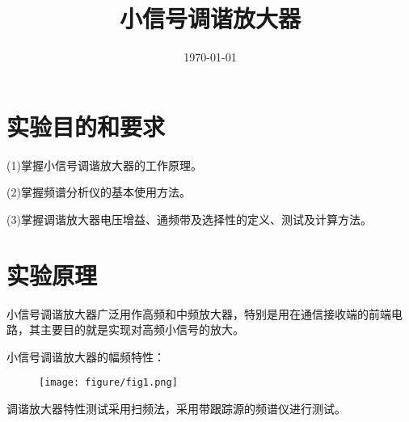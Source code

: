 \documentclass{../source/Experiment}
\title{小信号调谐放大器}
\date{\today}
\begin{document}
\section{实验目的和要求}
    (1)掌握小信号调谐放大器的工作原理。

    (2)掌握频谱分析仪的基本使用方法。

    (3)掌握调谐放大器电压增益、通频带及选择性的定义、测试及计算方法。

    \section{实验原理}
    小信号调谐放大器广泛用作高频和中频放大器，特别是用在通信接收端的前端电路，其主要目的就是实现对高频小信号的放大。

    小信号调谐放大器的幅频特性：
    \begin{figure}[H]
        \centering
        \texttt{[image: figure/fig1.png]}
    \end{figure}

    调谐放大器特性测试采用扫频法，采用带跟踪源的频谱仪进行测试。
\end{document}
